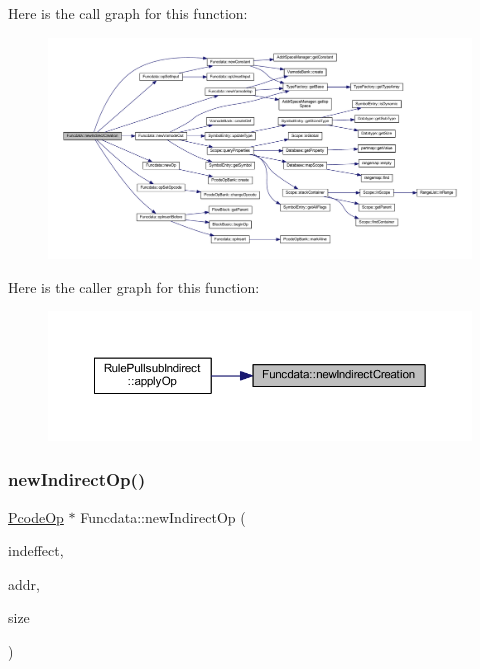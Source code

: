 Here is the call graph for this function\+:
\nopagebreak
\begin{figure}[H]
\begin{center}
\leavevmode
\includegraphics[width=350pt]{class_funcdata_add1098b768d9a176cf59e4f4c9e27cb5_cgraph}
\end{center}
\end{figure}
Here is the caller graph for this function\+:
\nopagebreak
\begin{figure}[H]
\begin{center}
\leavevmode
\includegraphics[width=350pt]{class_funcdata_add1098b768d9a176cf59e4f4c9e27cb5_icgraph}
\end{center}
\end{figure}
\mbox{\label{class_funcdata_ae12a353a87a208c1a39442571990fb9f}} 
\subsubsection{\texorpdfstring{newIndirectOp()}{newIndirectOp()}}
{\footnotesize\ttfamily \mbox{\hyperlink{class_pcode_op}{Pcode\+Op}} $\ast$ Funcdata\+::new\+Indirect\+Op (\begin{DoxyParamCaption}\item[{\mbox{\hyperlink{class_pcode_op}{Pcode\+Op}} $\ast$}]{indeffect,  }\item[{const \mbox{\hyperlink{class_address}{Address}} \&}]{addr,  }\item[{int4}]{size }\end{DoxyParamCaption})}



